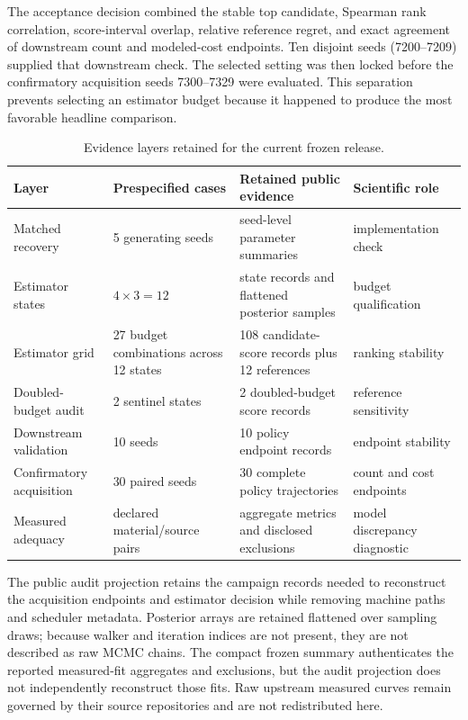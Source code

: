 \documentclass[10pt,a4paper,twocolumn]{article}
\begin{document}
The acceptance decision combined the stable top candidate, Spearman rank
correlation, score-interval overlap, relative reference regret, and exact
agreement of downstream count and modeled-cost endpoints. Ten disjoint seeds
(7200--7209) supplied that downstream check. The selected setting was then
locked before the confirmatory acquisition seeds 7300--7329 were evaluated.
This separation prevents selecting an estimator budget because it happened to
produce the most favorable headline comparison.

\begin{table}[t]
\caption{Evidence layers retained for the current frozen release.}
\label{tab:evidence-layers}
\centering\footnotesize
\begin{tabular}{@{}p{}p{}p{}p{}@{}}
\toprule
Layer & Prespecified cases & Retained public evidence & Scientific role \\
\midrule
Matched recovery & 5 generating seeds & seed-level parameter summaries & implementation check \\
Estimator states & $4\times3=12$ & state records and flattened posterior samples & budget qualification \\
Estimator grid & 27 budget combinations across 12 states & 108 candidate-score records plus 12 references & ranking stability \\
Doubled-budget audit & 2 sentinel states & 2 doubled-budget score records & reference sensitivity \\
Downstream validation & 10 seeds & 10 policy endpoint records & endpoint stability \\
Confirmatory acquisition & 30 paired seeds & 30 complete policy trajectories & count and cost endpoints \\
Measured adequacy & declared material/source pairs & aggregate metrics and disclosed exclusions & model discrepancy diagnostic \\
\bottomrule
\end{tabular}
\end{table}

The public audit projection retains the campaign records needed to reconstruct
the acquisition endpoints and estimator decision while removing machine paths
and scheduler metadata. Posterior arrays are retained flattened over sampling
draws; because walker and iteration indices are not present, they are not
described as raw MCMC chains. The compact frozen summary authenticates the
reported measured-fit aggregates and exclusions, but the audit projection does
not independently reconstruct those fits. Raw upstream measured curves remain
governed by their source repositories and are not redistributed here.
\end{document}
